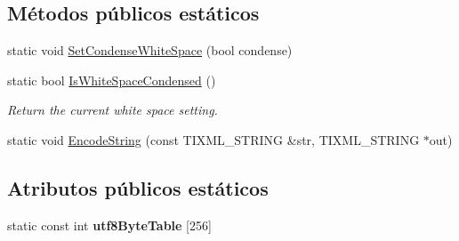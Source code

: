 \subsection*{\-Métodos públicos estáticos}
\begin{DoxyCompactItemize}
\item 
static void \hyperlink{classTiXmlBase_a0f799ec645bfb8d8a969e83478f379c1}{\-Set\-Condense\-White\-Space} (bool condense)
\item 
\hypertarget{classTiXmlBase_ad4b1472531c647a25b1840a87ae42438}{static bool \hyperlink{classTiXmlBase_ad4b1472531c647a25b1840a87ae42438}{\-Is\-White\-Space\-Condensed} ()}\label{classTiXmlBase_ad4b1472531c647a25b1840a87ae42438}

\begin{DoxyCompactList}\small\item\em \-Return the current white space setting. \end{DoxyCompactList}\item 
static void \hyperlink{classTiXmlBase_a32ed202562b58de64c7d799ca3c9db98}{\-Encode\-String} (const \-T\-I\-X\-M\-L\-\_\-\-S\-T\-R\-I\-N\-G \&str, \-T\-I\-X\-M\-L\-\_\-\-S\-T\-R\-I\-N\-G $\ast$out)
\end{DoxyCompactItemize}
\subsection*{\-Atributos públicos estáticos}
\begin{DoxyCompactItemize}
\item 
static const int {\bfseries utf8\-Byte\-Table} \mbox{[}256\mbox{]}
\end{DoxyCompactItemize}
